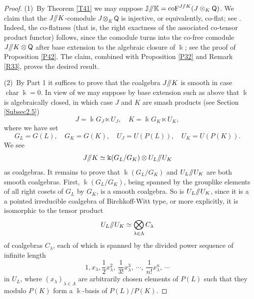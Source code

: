 \documentclass[11pt, a4paper]{amsart}
\theoremstyle{definition}
\numberwithin{equation}{section}
\begin{document}
\begin{proof}
(1)\
By Theorem \ref{T41} we may suppose 
$\mathbb{J}/\hspace{-1mm}/\mathbb{K}
=
\operatorname{coF}^{J/\hspace{-1mm}/K}(J\otimes_K\mathsf{Q})$. 
We claim that the $J/\hspace{-1mm}/K$-comodule
$J\otimes_K\mathsf{Q}$ is injective, or equivalently,
co-flat; see \cite[Proposition A.2.1]{T0}. Indeed, the co-flatness (that is,
the right exactness of the associated co-tensor product
functor) follows, since the comodule turns into the co-free
comodule $J/\hspace{-1mm}/K\otimes \mathsf{Q}$ 
after base extension to the algebraic closure of $\Bbbk$;
see the proof of Proposition \ref{P42}. 
The claim, combined with
Proposition \ref{P32} and Remark \ref{R33},
proves the desired result. 

(2)\
By Part 1 it suffices to prove that
the coalgebra $J/\hspace{-1mm}/K$ is smooth in case
$\operatorname{char} \Bbbk=0$.
In view of \cite[Proposition 1.5]{FS} we may suppose by base extension such as above
that $\Bbbk$ is algebraically closed, in which case $J$ and $K$ are smash products 
(see Section \ref{Subsec2.5})
\[
J=\Bbbk G_J\ltimes U_J,\quad  K=\Bbbk G_K\ltimes U_K,
\]
where we have set
\[
G_L=G(L),\quad G_K=G(K),\quad U_J=U(P(L)),\quad U_K=U(P(K)). 
\]
 We see
\[
J/\hspace{-1mm}/K\simeq\Bbbk(G_L/G_K)\otimes 
U_L/\hspace{-1mm}/U_K
\]
as coalgebras. 
It remains to prove that $\Bbbk(G_L/G_K)$ and $U_L/\hspace{-1mm}/U_K$ are both smooth coalgebras. 
First, $\Bbbk(G_L/G_K)$, being spanned by
the grouplike elements of all right cosets of $G_L$ by $G_K$, is a smooth coalgebra. So is 
$U_L/\hspace{-1mm}/U_K$, since it is a
a pointed irreducible coalgebra of Birchkoff-Witt type, 
or more explicitly, it is isomorphic to the tensor product 
\[
U_L/\hspace{-1mm}/U_K\simeq \bigotimes_{\lambda \in \Lambda} C_{\lambda}
\]
of coalgebras $C_{\lambda}$, each of which is spanned by 
the divided power sequence of infinite length
\[
1, x_{\lambda}, \frac{1}{2}x_{\lambda}^2,\ \frac{1}{3!}x_{\lambda}^3,\ \cdots,\ \frac{1}{n!}x_{\lambda}^n,\ \cdots
\]
in $U_L$, where $(x_{\lambda})_{\lambda\in \Lambda}$ are arbitrarily chosen elements of $P(L)$ 
such that they modulo $P(K)$ form
a $\Bbbk$-basis of $P(L)/P(K)$. 
\end{proof}
\end{document}
